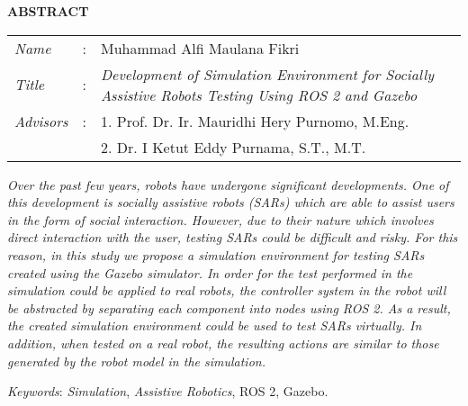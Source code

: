 \begin{center}
  \large\textbf{ABSTRACT}
\end{center}

\vspace{2ex}

\begingroup
  \setlength{\tabcolsep}{0pt}
  \noindent
  \begin{tabularx}{\textwidth}{l >{\centering}m{2em} X}
    \emph{Name}     &:& Muhammad Alfi Maulana Fikri \\
    \emph{Title}    &:&	\emph{Development of Simulation Environment for Socially Assistive Robots Testing Using ROS 2 and Gazebo} \\
    \emph{Advisors} &:& 1. Prof. Dr. Ir. Mauridhi Hery Purnomo, M.Eng. \\
                    & & 2. Dr. I Ketut Eddy Purnama, S.T., M.T. \\
  \end{tabularx}
\endgroup

\emph{
  Over the past few years,
    robots have undergone significant developments.
  One of this development is socially assistive robots (SARs) which are able to assist users in the form of social interaction.
  However, due to their nature which involves direct interaction with the user,
    testing SARs could be difficult and risky.
  For this reason, in this study we propose a simulation environment for testing SARs created using the Gazebo simulator.
  In order for the test performed in the simulation could be applied to real robots,
    the controller system in the robot will be abstracted by separating each component into nodes using ROS 2.
  As a result, the created simulation environment could be used to test SARs virtually.
    In addition, when tested on a real robot,
    the resulting actions are similar to those generated by the robot model in the simulation.
}

\emph{Keywords}: \emph{Simulation}, \emph{Assistive Robotics}, ROS 2, Gazebo.
